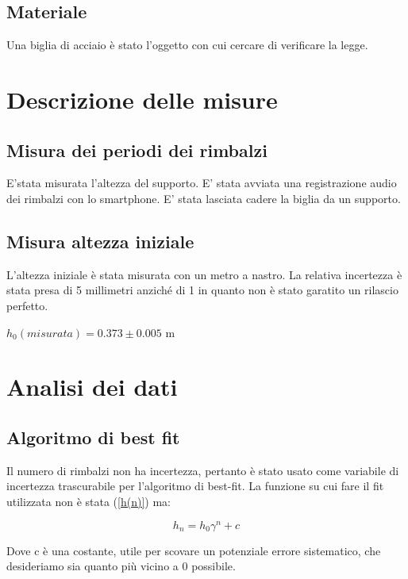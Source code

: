 \documentclass{article}
\begin{document}
\subsection{Materiale}
Una biglia di acciaio è stato l'oggetto con cui cercare di verificare la legge.


\section{Descrizione delle misure}

\subsection{Misura dei periodi dei rimbalzi}
E'stata misurata l'altezza del supporto.
E' stata avviata una registrazione audio dei rimbalzi con lo smartphone. 
E' stata lasciata cadere la biglia da un supporto.

\subsection{Misura altezza iniziale}

L'altezza iniziale è stata misurata con un metro a nastro.
La relativa incertezza è stata presa di 5 millimetri anziché di 1 in quanto non è stato garatito un rilascio perfetto.

\centering

		$h_{0} (misurata)=0.373\pm0.005$ m

\raggedright

\section{Analisi dei dati}




\subsection{Algoritmo di best fit}
Il numero di rimbalzi non ha incertezza, pertanto  è stato usato come variabile di incertezza trascurabile per l'algoritmo di best-fit.
La funzione su cui fare il fit utilizzata non è stata (\ref{h(n)}) ma:

\begin{equation}
	h_{n} = h_{0}  \gamma^{n}+c
		\label{h(n)+c}
\end{equation}

Dove c è una costante, utile per scovare un potenziale errore sistematico, che desideriamo sia quanto più vicino a 0  possibile.
\end{document}
